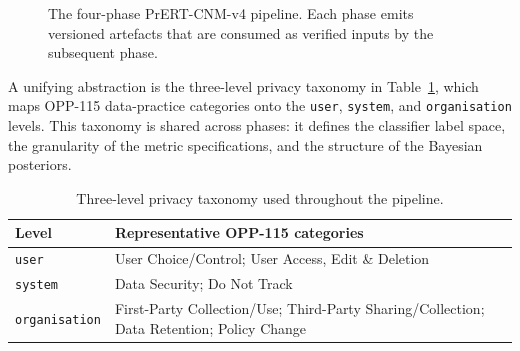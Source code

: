 \documentclass[conference]{IEEEtran}
\begin{document}
\begin{figure}[t]
\centering
{}
\caption{The four-phase PrERT-CNM-v4 pipeline. Each phase emits versioned
artefacts that are consumed as verified inputs by the subsequent phase.}
\label{fig:pipeline}
\end{figure}

A unifying abstraction is the three-level privacy taxonomy in
Table~\ref{tab:labelspace}, which maps OPP-115 data-practice categories onto
the \texttt{user}, \texttt{system}, and \texttt{organisation} levels. This
taxonomy is shared across phases: it defines the classifier label space, the
granularity of the metric specifications, and the structure of the Bayesian
posteriors.

\begin{table}[t]
\centering
\caption{Three-level privacy taxonomy used throughout the pipeline.}
\label{tab:labelspace}
\footnotesize
\begin{tabular}{@{}p{} p{}@{}}
\toprule
\textbf{Level} & \textbf{Representative OPP-115 categories} \\
\midrule
\texttt{user} & User Choice/Control; User Access, Edit \& Deletion \\
\texttt{system} & Data Security; Do Not Track \\
\texttt{organisation} & First-Party Collection/Use; Third-Party Sharing/Collection; Data Retention; Policy Change \\
\bottomrule
\end{tabular}
\end{table}
\end{document}
